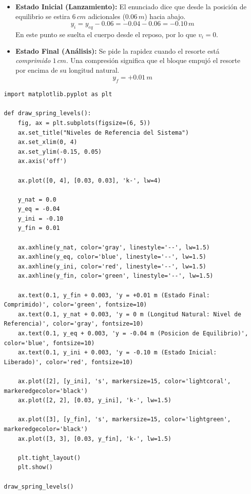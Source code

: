 \documentclass[12pt, a4paper]{article}
\begin{document}
\begin{itemize}
    \item \textbf{Estado Inicial (Lanzamiento):} El enunciado dice que desde la posición de equilibrio se estira $6 \, \si{cm}$ adicionales ($0.06 \, \si{m}$) hacia abajo.
    $$ y_i = y_{eq} - 0.06 = -0.04 - 0.06 = -0.10 \, \si{m} $$
    En este punto se suelta el cuerpo desde el reposo, por lo que $v_i = 0$.
    
    \item \textbf{Estado Final (Análisis):} Se pide la rapidez cuando el resorte está \textit{comprimido} $1 \, \si{cm}$. Una compresión significa que el bloque empujó el resorte por encima de su longitud natural.
    $$ y_f = +0.01 \, \si{m} $$
\end{itemize}

\begin{lstlisting}
import matplotlib.pyplot as plt

def draw_spring_levels():
    fig, ax = plt.subplots(figsize=(6, 5))
    ax.set_title("Niveles de Referencia del Sistema")
    ax.set_xlim(0, 4)
    ax.set_ylim(-0.15, 0.05)
    ax.axis('off')
    
    ax.plot([0, 4], [0.03, 0.03], 'k-', lw=4)
    
    y_nat = 0.0
    y_eq = -0.04
    y_ini = -0.10
    y_fin = 0.01
    
    ax.axhline(y_nat, color='gray', linestyle='--', lw=1.5)
    ax.axhline(y_eq, color='blue', linestyle='--', lw=1.5)
    ax.axhline(y_ini, color='red', linestyle='--', lw=1.5)
    ax.axhline(y_fin, color='green', linestyle='--', lw=1.5)
    
    ax.text(0.1, y_fin + 0.003, 'y = +0.01 m (Estado Final: Comprimido)', color='green', fontsize=10)
    ax.text(0.1, y_nat + 0.003, 'y = 0 m (Longitud Natural: Nivel de Referencia)', color='gray', fontsize=10)
    ax.text(0.1, y_eq + 0.003, 'y = -0.04 m (Posicion de Equilibrio)', color='blue', fontsize=10)
    ax.text(0.1, y_ini + 0.003, 'y = -0.10 m (Estado Inicial: Liberado)', color='red', fontsize=10)
    
    ax.plot([2], [y_ini], 's', markersize=15, color='lightcoral', markeredgecolor='black')
    ax.plot([2, 2], [0.03, y_ini], 'k-', lw=1.5)
    
    ax.plot([3], [y_fin], 's', markersize=15, color='lightgreen', markeredgecolor='black')
    ax.plot([3, 3], [0.03, y_fin], 'k-', lw=1.5)

    plt.tight_layout()
    plt.show()

draw_spring_levels()
\end{lstlisting}
\end{document}
